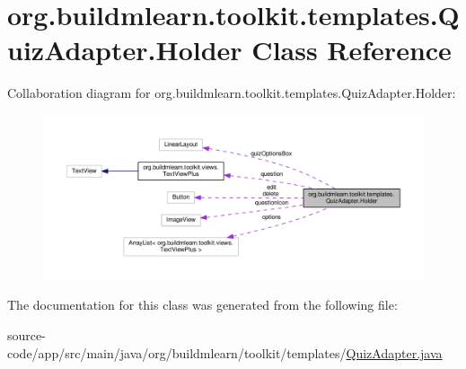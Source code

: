 \hypertarget{classorg_1_1buildmlearn_1_1toolkit_1_1templates_1_1QuizAdapter_1_1Holder}{}\section{org.\+buildmlearn.\+toolkit.\+templates.\+Quiz\+Adapter.\+Holder Class Reference}
\label{classorg_1_1buildmlearn_1_1toolkit_1_1templates_1_1QuizAdapter_1_1Holder}


Collaboration diagram for org.\+buildmlearn.\+toolkit.\+templates.\+Quiz\+Adapter.\+Holder\+:
\nopagebreak
\begin{figure}[H]
\begin{center}
\leavevmode
\includegraphics[width=350pt]{classorg_1_1buildmlearn_1_1toolkit_1_1templates_1_1QuizAdapter_1_1Holder__coll__graph}
\end{center}
\end{figure}


The documentation for this class was generated from the following file\+:\begin{DoxyCompactItemize}
\item 
source-\/code/app/src/main/java/org/buildmlearn/toolkit/templates/\hyperlink{QuizAdapter_8java}{Quiz\+Adapter.\+java}\end{DoxyCompactItemize}

